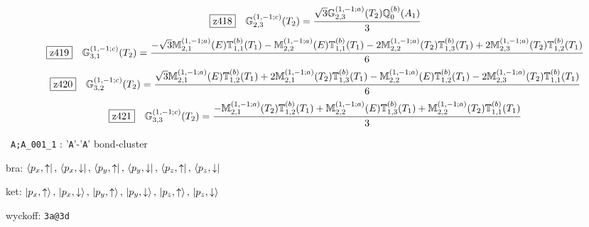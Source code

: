 \documentclass[fleqn,10pt,landscape]{jsarticle}
\begin{document}
\begin{dmath*}
\hspace*{3mm}\fbox{z418}\quad \mathbb{G}_{2,3}^{(1,-1;c)}(T_{2})=\frac{\sqrt{3} \mathbb{G}_{2,3}^{(1,-1;a)}(T_{2}) \mathbb{Q}_{0}^{(b)}(A_{1})}{3}
\end{dmath*}
\begin{dmath*}
\hspace*{3mm}\fbox{z419}\quad \mathbb{G}_{3,1}^{(1,-1;c)}(T_{2})=\frac{- \sqrt{3} \mathbb{M}_{2,1}^{(1,-1;a)}(E) \mathbb{T}_{1,1}^{(b)}(T_{1}) - \mathbb{M}_{2,2}^{(1,-1;a)}(E) \mathbb{T}_{1,1}^{(b)}(T_{1}) - 2 \mathbb{M}_{2,2}^{(1,-1;a)}(T_{2}) \mathbb{T}_{1,3}^{(b)}(T_{1}) + 2 \mathbb{M}_{2,3}^{(1,-1;a)}(T_{2}) \mathbb{T}_{1,2}^{(b)}(T_{1})}{6}
\end{dmath*}
\begin{dmath*}
\hspace*{3mm}\fbox{z420}\quad \mathbb{G}_{3,2}^{(1,-1;c)}(T_{2})=\frac{\sqrt{3} \mathbb{M}_{2,1}^{(1,-1;a)}(E) \mathbb{T}_{1,2}^{(b)}(T_{1}) + 2 \mathbb{M}_{2,1}^{(1,-1;a)}(T_{2}) \mathbb{T}_{1,3}^{(b)}(T_{1}) - \mathbb{M}_{2,2}^{(1,-1;a)}(E) \mathbb{T}_{1,2}^{(b)}(T_{1}) - 2 \mathbb{M}_{2,3}^{(1,-1;a)}(T_{2}) \mathbb{T}_{1,1}^{(b)}(T_{1})}{6}
\end{dmath*}
\begin{dmath*}
\hspace*{3mm}\fbox{z421}\quad \mathbb{G}_{3,3}^{(1,-1;c)}(T_{2})=\frac{- \mathbb{M}_{2,1}^{(1,-1;a)}(T_{2}) \mathbb{T}_{1,2}^{(b)}(T_{1}) + \mathbb{M}_{2,2}^{(1,-1;a)}(E) \mathbb{T}_{1,3}^{(b)}(T_{1}) + \mathbb{M}_{2,2}^{(1,-1;a)}(T_{2}) \mathbb{T}_{1,1}^{(b)}(T_{1})}{3}
\end{dmath*}
\vspace{5mm}

\noindent\textbullet\, \texttt{A;A_001_1} : '\texttt{A}'-'\texttt{A}' bond-cluster

\noindent\quad * bra: $\bra{p_{x},\uparrow},\, \bra{p_{x},\downarrow},\, \bra{p_{y},\uparrow},\, \bra{p_{y},\downarrow},\, \bra{p_{z},\uparrow},\, \bra{p_{z},\downarrow}$

\noindent\quad * ket: $\ket{p_{x},\uparrow},\, \ket{p_{x},\downarrow},\, \ket{p_{y},\uparrow},\, \ket{p_{y},\downarrow},\, \ket{p_{z},\uparrow},\, \ket{p_{z},\downarrow}$

\noindent\quad * wyckoff: \texttt{3a@3d}
\end{document}
